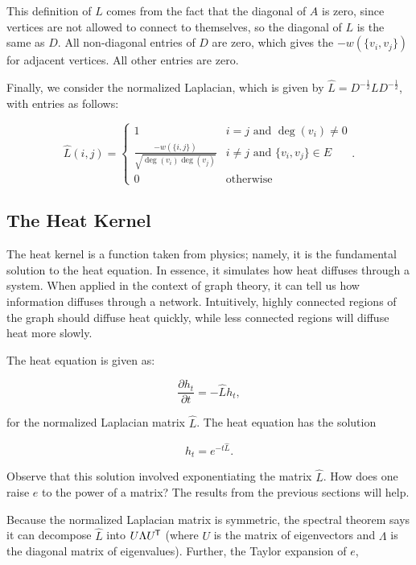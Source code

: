 \noindent This definition of \(L\) comes from the fact that the diagonal of \(A\) is zero, since vertices are not allowed to connect to themselves, so the diagonal of \(L\) is the same as \(D\). All non-diagonal entries of \(D\) are zero, which gives the \(-w(\{v_{i}, v_{j}\})\) for adjacent vertices. All other entries are zero.

Finally, we consider the normalized Laplacian, which is given by \(\hat{L} = D^{-\frac{1}{2}}LD^{-\frac{1}{2}}\), with entries as follows:

\begin{equation}
	\hat{L}(i, j) = \begin{cases}
1 & i = j \text{ and } \deg(v_{i}) \neq 0\\
\frac{-w(\{i, j\})}{\sqrt{\deg(v_{i})\deg(v_{j})}} & i \neq j \text{ and } \{v_{i}, v_{j}\} \in E\\
0 & \text{otherwise}
\end{cases}.
\end{equation}

\subsection{The Heat Kernel}
\label{sec:heatkernel}

The heat kernel is a function taken from physics; namely, it is the fundamental solution to the heat equation. In essence, it simulates how heat diffuses through a system. When applied in the context of graph theory, it can tell us how information diffuses through a network. Intuitively, highly connected regions of the graph should diffuse heat quickly, while less connected regions will diffuse heat more slowly.

The heat equation is given as:

\begin{equation}
	\frac{\partial h_{t}}{\partial t} = -\hat{L}h_{t},
\end{equation}

\noindent for the normalized Laplacian matrix \(\hat{L}\). The heat equation has the solution

\begin{equation}
	h_{t} = e^{-t\hat{L}}.
\end{equation}

Observe that this solution involved exponentiating the matrix \(\hat{L}\). How does one raise \(e\) to the power of a matrix? The results from the previous sections will help.

Because the normalized Laplacian matrix is symmetric, the spectral theorem says it can decompose \(\hat{L}\) into \(U\Lambda U^{\mkern-1.5mu\mathsf{T}}\) (where \(U\) is the matrix of eigenvectors and \(\Lambda\) is the diagonal matrix of eigenvalues). Further, the Taylor expansion of \(e\),

